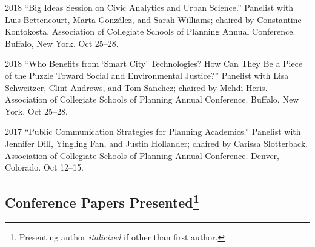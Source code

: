 \documentclass[11pt,letterpaper]{report}
\begin{document}
\begin{tablist}
        \item[2018] \tab{}\enquote{Big Ideas Session on Civic Analytics and Urban Science.} Panelist with Luis Bettencourt, Marta Gonz{\'a}lez, and Sarah Williams; chaired by Constantine Kontokosta. Association of Collegiate Schools of Planning Annual Conference. Buffalo, New York. Oct 25--28.

        \item[2018] \tab{}\enquote{Who Benefits from \enquote{Smart City} Technologies? How Can They Be a Piece of the Puzzle Toward Social and Environmental Justice?} Panelist with Lisa Schweitzer, Clint Andrews, and Tom Sanchez; chaired by Mehdi Heris. Association of Collegiate Schools of Planning Annual Conference. Buffalo, New York. Oct 25--28.

        \item[2017] \tab{}\enquote{Public Communication Strategies for Planning Academics.} Panelist with Jennifer Dill, Yingling Fan, and Justin Hollander; chaired by Carissa Slotterback. Association of Collegiate Schools of Planning Annual Conference. Denver, Colorado. Oct 12--15.

    \end{tablist}

    \subsection*{Conference Papers Presented\footnote{Presenting author \textit{italicized} if other than first author.}}
\end{document}
